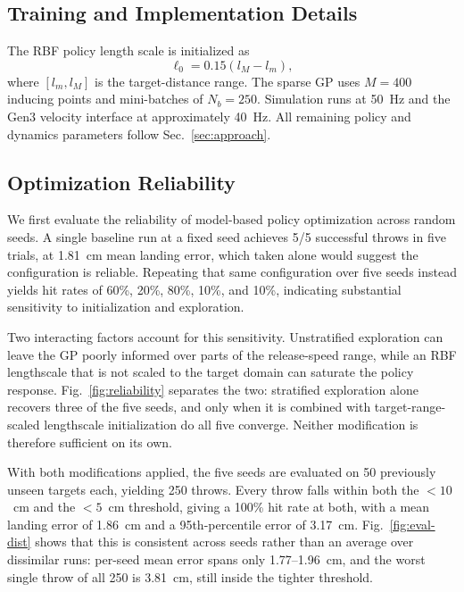 \documentclass[letterpaper, 10 pt, conference]{ieeeconf}
\begin{document}
\subsection{Training and Implementation Details} \label{sec:setup-implementation} 
The RBF policy length scale is initialized as \begin{equation} \ell_0=0.15(l_M-l_m), \end{equation} where $[l_m,l_M]$ is the target-distance range. The sparse GP uses $M=400$ inducing points and mini-batches of $N_b=250$. Simulation runs at 50~Hz and the Gen3 velocity interface at approximately 40~Hz. All remaining policy and dynamics parameters follow Sec.~\ref{sec:approach}.


\subsection{Optimization Reliability}
\label{sec:results-baseline}

We first evaluate the reliability of model-based policy optimization across
random seeds. A single baseline run at a fixed seed achieves 5/5 successful
throws in five trials, at 1.81~cm mean landing error, which taken alone would
suggest the configuration is reliable. Repeating that same configuration over
five seeds instead yields hit rates of 60\%, 20\%, 80\%, 10\%, and 10\%,
indicating substantial sensitivity to initialization and exploration.

Two interacting factors account for this sensitivity. Unstratified exploration
can leave the GP poorly informed over parts of the release-speed range, while
an RBF lengthscale that is not scaled to the target domain can saturate the
policy response. Fig.~\ref{fig:reliability} separates the two: stratified
exploration alone recovers three of the five seeds, and only when it is
combined with target-range-scaled lengthscale initialization do all five
converge. Neither modification is therefore sufficient on its own.

With both modifications applied, the five seeds are evaluated on 50 previously
unseen targets each, yielding 250 throws. Every throw falls within both the
$<10$~cm and the $<5$~cm threshold, giving a 100\% hit rate at both, with a
mean landing error of 1.86~cm and a 95th-percentile error of 3.17~cm.
Fig.~\ref{fig:eval-dist} shows that this is consistent across seeds rather than
an average over dissimilar runs: per-seed mean error spans only
1.77--1.96~cm, and the worst single throw of all 250 is 3.81~cm, still inside
the tighter threshold.
\end{document}
